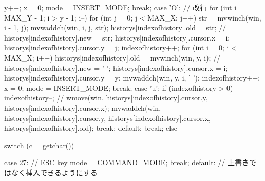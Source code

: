 \documentclass[a4paper,11pt]{jsarticle}
\begin{document}
{{{{{                }
                y++;
                x = 0;
                mode = INSERT_MODE;
                break;
            case 'O':
                // 改行
                for (int i = MAX_Y - 1; i > y - 1; i--)
                {
                    for (int j = 0; j < MAX_X; j++)
                    {
                        str = mvwinch(win, i - 1, j);
                        mvwaddch(win, i, j, str);
                        historys[indexofhistory].old = str;
                        // historys[indexofhistory].new = str;
                        historys[indexofhistory].cursor.x = i;
                        historys[indexofhistory].cursor.y = j;
                        indexofhistory++;
                    }
                }
                for (int i = 0; i < MAX_X; i++)
                {
                    historys[indexofhistory].old = mvwinch(win, y, i);
                    // historys[indexofhistory].new = ' ';
                    historys[indexofhistory].cursor.x = i;
                    historys[indexofhistory].cursor.y = y;
                    mvwaddch(win, y, i, ' ');
                    indexofhistory++;
                }
                x = 0;
                mode = INSERT_MODE;
                break;
            case 'u':
                if (indexofhistory > 0)
                {
                    indexofhistory--;
                    // wmove(win, historys[indexofhistory].cursor.y, historys[indexofhistory].cursor.x);
                    mvwaddch(win, historys[indexofhistory].cursor.y, historys[indexofhistory].cursor.x, historys[indexofhistory].old);
                }
                break;
            default:
                break;
            }
        }
        else
        {
            switch (c = getchar())
            {
            case 27: // ESC key
                mode = COMMAND_MODE;
                break;
            default:
                // 上書きではなく挿入できるようにする

}}}}
\end{document}
